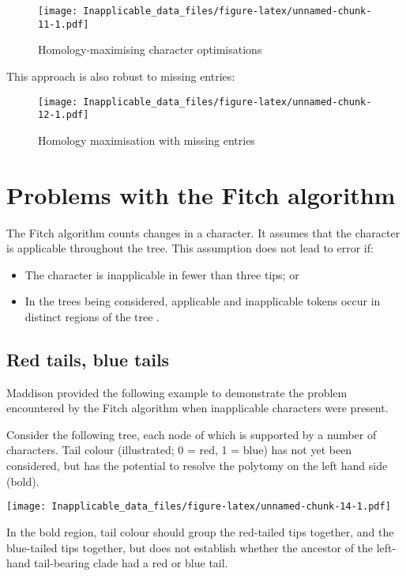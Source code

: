 \documentclass[]{book}
\theoremstyle{definition}
\theoremstyle{definition}
\theoremstyle{definition}
\theoremstyle{remark}
\begin{document}
\begin{figure}
\centering
\texttt{[image: Inapplicable\_data\_files/figure-latex/unnamed-chunk-11-1.pdf]}
\caption{\label{fig:unnamed-chunk-11}Homology-maximising character
optimisations}
\end{figure}

This approach is also robust to missing entries:

\begin{figure}
\centering
\texttt{[image: Inapplicable\_data\_files/figure-latex/unnamed-chunk-12-1.pdf]}
\caption{\label{fig:unnamed-chunk-12}Homology maximisation with missing
entries}
\end{figure}

\hypertarget{problems}{%
\chapter{Problems with the Fitch algorithm}\label{problems}}

The Fitch algorithm \citep{Fitch1971} counts changes in a character. It
assumes that the character is applicable throughout the tree. This
assumption does not lead to error if:

\begin{itemize}
\item
  The character is inapplicable in fewer than three tips; or
\item
  In the trees being considered, applicable and inapplicable tokens
  occur in distinct regions of the tree \citep{Maddison1993}.
\end{itemize}

\hypertarget{red-tails-blue-tails}{%
\section{Red tails, blue tails}\label{red-tails-blue-tails}}

Maddison \citeyearpar{Maddison1993} provided the following example to
demonstrate the problem encountered by the Fitch algorithm when
inapplicable characters were present.

Consider the following tree, each node of which is supported by a number
of characters. Tail colour (illustrated; 0 = red, 1 = blue) has not yet
been considered, but has the potential to resolve the polytomy on the
left hand side (bold).

\texttt{[image: Inapplicable\_data\_files/figure-latex/unnamed-chunk-14-1.pdf]}

In the bold region, tail colour should group the red-tailed tips
together, and the blue-tailed tips together, but does not establish
whether the ancestor of the left-hand tail-bearing clade had a red or
blue tail.
\end{document}
